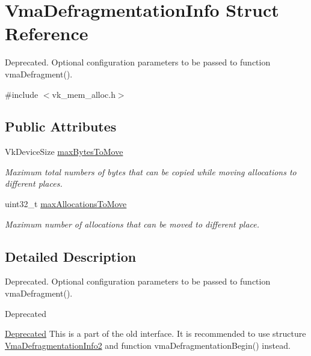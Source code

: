 \hypertarget{structVmaDefragmentationInfo}{}\section{Vma\+Defragmentation\+Info Struct Reference}
\label{structVmaDefragmentationInfo}


Deprecated. Optional configuration parameters to be passed to function vma\+Defragment().  




{\ttfamily \#include $<$vk\+\_\+mem\+\_\+alloc.\+h$>$}

\subsection*{Public Attributes}
\begin{DoxyCompactItemize}
\item 
Vk\+Device\+Size \hyperlink{structVmaDefragmentationInfo_acb311c940a777270e67e1b81c5ab6a1d}{max\+Bytes\+To\+Move}
\begin{DoxyCompactList}\small\item\em Maximum total numbers of bytes that can be copied while moving allocations to different places. \end{DoxyCompactList}\item 
uint32\+\_\+t \hyperlink{structVmaDefragmentationInfo_aa7c7304e13c71f604c907196c4e28fbc}{max\+Allocations\+To\+Move}
\begin{DoxyCompactList}\small\item\em Maximum number of allocations that can be moved to different place. \end{DoxyCompactList}\end{DoxyCompactItemize}


\subsection{Detailed Description}
Deprecated. Optional configuration parameters to be passed to function vma\+Defragment(). 

\begin{DoxyRefDesc}{Deprecated}
\item[\hyperlink{deprecated__deprecated000005}{Deprecated}]This is a part of the old interface. It is recommended to use structure \hyperlink{structVmaDefragmentationInfo2}{Vma\+Defragmentation\+Info2} and function vma\+Defragmentation\+Begin() instead. \end{DoxyRefDesc}


